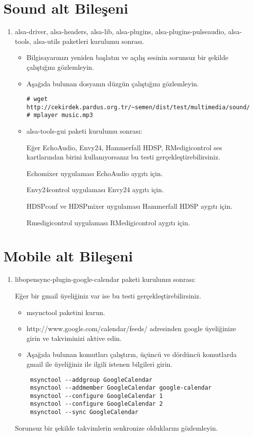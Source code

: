 \documentclass[a4paper,10pt]{article}
\begin{document}
\section{Sound alt Bileşeni}
\begin{enumerate}
 \item alsa-driver, alsa-headers, alsa-lib, alsa-plugins, alsa-plugins-pulseaudio, alsa-tools, alsa-utils paketleri kurulumu sonrası.
\begin{itemize}
 \item Bilgisayarınızı yeniden başlatın ve açılış sesinin sorunsuz bir şekilde çalıştığını gözlemleyin.
 \item Aşağıda bulunan dosyanın düzgün çalıştığını gözlemleyin.
\begin{verbatim}
# wget http://cekirdek.pardus.org.tr/~semen/dist/test/multimedia/sound/sound/music.mp3
# mplayer music.mp3
\end{verbatim}

\item alsa-tools-gui paketi kurulumu sonrası:

Eğer  EchoAudio, Envy24, Hammerfall HDSP, RMedigicontrol ses kartlarından birini kullanıyorsanız bu testi gerçekleştirebilirsiniz.

Echomixer uygulaması EchoAudio aygıtı için.

Envy24control uygulaması Envy24 aygıtı için.

HDSPconf ve HDSPmixer uygulaması Hammerfall HDSP aygıtı için.

Rmedigicontrol uygulaması RMedigicontrol aygıtı için.
\end{itemize}


\end{enumerate}
\section{Mobile alt Bileşeni}
\begin{enumerate}
 \item libopensync-plugin-google-calendar paketi kurulumu sonrası:

Eğer bir gmail üyeliğiniz var ise bu testi gerçekleştirebilirsiniz.
\begin{itemize}
 \item msynctool paketini kurun.
 \item http://www.google.com/calendar/feeds/ adresinden google üyeliğinize girin ve takviminizi aktive edin.
 \item Aşağıda bulunan komutları çalıştırın, üçüncü ve dördüncü komutlarda gmail ile üyeliğiniz ile ilgili istenen bilgileri girin.

\begin{verbatim}
 msynctool --addgroup GoogleCalendar
 msynctool --addmember GoogleCalendar google-calendar
 msynctool --configure GoogleCalendar 1
 msynctool --configure GoogleCalendar 2
 msynctool --sync GoogleCalendar	
\end{verbatim}

\end{itemize}

Sorunsuz bir şekilde takvimlerin senkronize olduklarını gözlemleyin.	
\end{enumerate}
\end{document}

